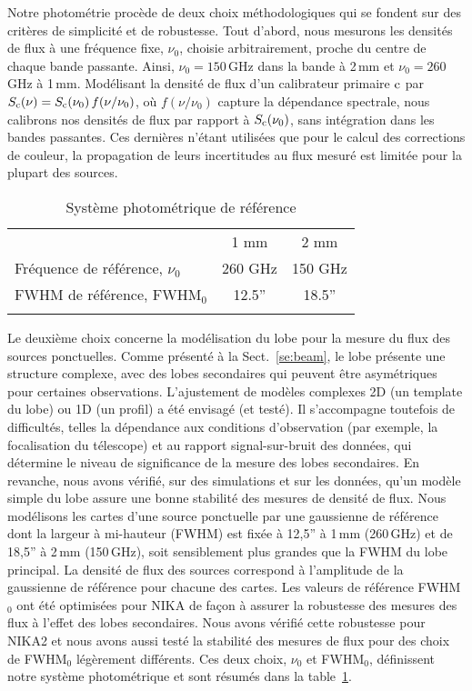Notre photométrie procède de deux choix méthodologiques qui se fondent
sur des critères de simplicité et de robustesse. Tout d'abord, nous
mesurons les densités de flux à une fréquence fixe, $\nu_0$, choisie
arbitrairement, proche du centre de chaque bande passante. Ainsi,
$\nu_0 = 150$\,GHz dans la bande à 2\,mm et $\nu_0 = 260$\,GHz à
1\,mm. Modélisant la densité de flux d'un calibrateur primaire
$\rm{c}$ par $S_{\rm{c}} (\nu) = S_{\rm{c}} (\nu_0)\, f(\nu/\nu_0)$,
où $f(\nu/\nu_0)$ capture la dépendance spectrale, nous calibrons nos
densités de flux par rapport à $S_{\rm{c}} (\nu_0)$, sans intégration
dans les bandes passantes. Ces dernières n'étant utilisées que pour le
calcul des corrections de couleur, la propagation de leurs
incertitudes au flux mesuré est limitée pour la plupart des sources.
%
\begin{table}[!htbp]
\caption{Système photométrique de référence}
\label{tab:definitions}
\centering     
\begin{tabular}{lcc}
\hline\hline
      \noalign{\smallskip}
      & 1 mm & 2 mm \\
      \noalign{\smallskip}
      \hline
      \noalign{\smallskip}
      Fréquence de référence, $\nu_{0}$ & 260 GHz & 150 GHz \\
      FWHM de référence,  FWHM$_{0}$    & 12.5'' & 18.5'' \\
      \noalign{\smallskip}
      \hline
\end{tabular}
\end{table}
%

Le deuxième choix concerne la modélisation du lobe pour la mesure du
flux des sources ponctuelles. Comme présenté à la
Sect.~\ref{se:beam}, le lobe présente une structure complexe, avec
des lobes secondaires qui peuvent être asymétriques pour certaines
observations. L'ajustement de modèles complexes 2D (un template du
lobe) ou 1D (un profil) a été envisagé (et testé). Il s'accompagne
toutefois de difficultés, telles la dépendance aux conditions
d'observation (par exemple, la focalisation du télescope) et au
rapport signal-sur-bruit des données, qui détermine le niveau de
significance de la mesure des lobes secondaires. En revanche, nous
avons vérifié, sur des simulations et sur les données, qu'un modèle
simple du lobe assure une bonne stabilité des mesures de densité de
flux. Nous modélisons les cartes d'une source ponctuelle par une gaussienne
de référence dont la largeur à mi-hauteur (FWHM) est fixée à 
12,5'' à 1\,mm (260\,GHz) et de 18,5'' à 2\,mm (150\,GHz), soit
sensiblement plus grandes que la FWHM du lobe principal. La densité de
flux des sources correspond à l'amplitude de la gaussienne de
référence pour chacune des cartes. Les valeurs de référence FWHM$_0$ ont
été optimisées pour NIKA de façon à assurer la robustesse des mesures
des flux à l'effet des lobes secondaires. Nous avons vérifié cette
robustesse pour NIKA2 et nous avons aussi testé la stabilité des
mesures de flux pour des choix de FWHM$_0$ légèrement différents. Ces
deux choix, $\nu_0$ et FWHM$_0$, définissent notre système
photométrique et sont résumés dans la table~\ref{tab:definitions}.

